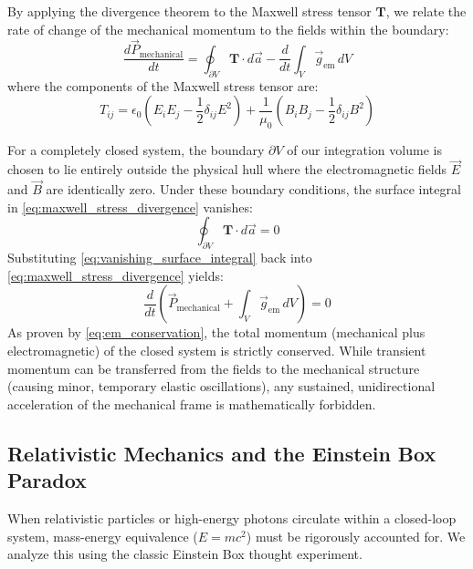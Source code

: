 \documentclass[journal,10pt,twoside]{IEEEtran}
\begin{document}
By applying the divergence theorem to the Maxwell stress tensor $\mathbf{T}$, we relate the rate of change of the mechanical momentum to the fields within the boundary:
\begin{equation}
\frac{d\vec{P}_{\text{mechanical}}}{dt} = \oint_{\partial V} \mathbf{T} \cdot d\vec{a} - \frac{d}{dt} \int_{V} \vec{g}_{\text{em}} \, dV
\label{eq:maxwell_stress_divergence}
\end{equation}
where the components of the Maxwell stress tensor are:
\begin{equation}
T_{ij} = \epsilon_0 \left( E_i E_j - \frac{1}{2} \delta_{ij} E^2 \right) + \frac{1}{\mu_0} \left( B_i B_j - \frac{1}{2} \delta_{ij} B^2 \right)
\label{eq:tensor_components}
\end{equation}

For a completely closed system, the boundary $\partial V$ of our integration volume is chosen to lie entirely outside the physical hull where the electromagnetic fields $\vec{E}$ and $\vec{B}$ are identically zero. Under these boundary conditions, the surface integral in \eqref{eq:maxwell_stress_divergence} vanishes:
\begin{equation}
\oint_{\partial V} \mathbf{T} \cdot d\vec{a} = 0
\label{eq:vanishing_surface_integral}
\end{equation}
Substituting \eqref{eq:vanishing_surface_integral} back into \eqref{eq:maxwell_stress_divergence} yields:
\begin{equation}
\frac{d}{dt} \left( \vec{P}_{\text{mechanical}} + \int_{V} \vec{g}_{\text{em}} \, dV \right) = 0
\label{eq:em_conservation}
\end{equation}
As proven by \eqref{eq:em_conservation}, the total momentum (mechanical plus electromagnetic) of the closed system is strictly conserved. While transient momentum can be transferred from the fields to the mechanical structure (causing minor, temporary elastic oscillations), any sustained, unidirectional acceleration of the mechanical frame is mathematically forbidden.

\subsection{Relativistic Mechanics and the Einstein Box Paradox}
When relativistic particles or high-energy photons circulate within a closed-loop system, mass-energy equivalence ($E = mc^2$) must be rigorously accounted for. We analyze this using the classic Einstein Box thought experiment.
\end{document}
